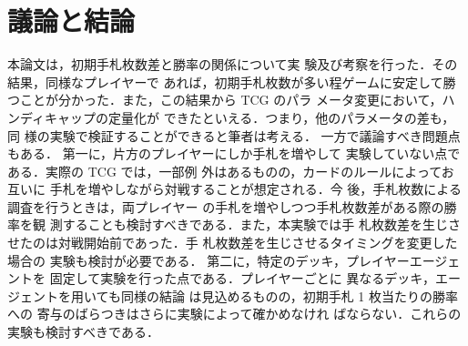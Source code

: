 \documentclass[twocolumn]{ltjsarticle}
\begin{document}
\section{議論と結論}
\small{
  本論文は，初期手札枚数差と勝率の関係について実
験及び考察を行った．その結果，同様なプレイヤーで
あれば，初期手札枚数が多い程ゲームに安定して勝
つことが分かった．また，この結果から TCG のパラ
メータ変更において，ハンディキャップの定量化が
できたといえる．つまり，他のパラメータの差も，同
様の実験で検証することができると筆者は考える．
一方で議論すべき問題点もある．
第一に，片方のプレイヤーにしか手札を増やして
実験していない点である．実際の TCG では，一部例
外はあるものの，カードのルールによってお互いに
手札を増やしながら対戦することが想定される．今
後，手札枚数による調査を行うときは，両プレイヤー
の手札を増やしつつ手札枚数差がある際の勝率を観
測することも検討すべきである．また，本実験では手
札枚数差を生じさせたのは対戦開始前であった．手
札枚数差を生じさせるタイミングを変更した場合の
実験も検討が必要である．
第二に，特定のデッキ，プレイヤーエージェントを
固定して実験を行った点である．プレイヤーごとに
異なるデッキ，エージェントを用いても同様の結論
は見込めるものの，初期手札 1 枚当たりの勝率への
寄与のばらつきはさらに実験によって確かめなけれ
ばならない．これらの実験も検討すべきである．
}
\end{document}
